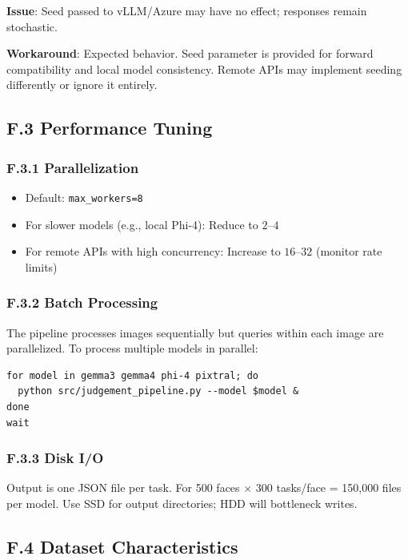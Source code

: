\textbf{Issue}: Seed passed to vLLM/Azure may have no effect; responses remain stochastic.

\textbf{Workaround}: Expected behavior. Seed parameter is provided for forward compatibility and local model consistency. Remote APIs may implement seeding differently or ignore it entirely.

\subsection*{F.3 Performance Tuning}

\subsubsection*{F.3.1 Parallelization}

\begin{itemize}
    \item Default: \texttt{max\_workers=8}
    \item For slower models (e.g., local Phi-4): Reduce to $2$--$4$
    \item For remote APIs with high concurrency: Increase to $16$--$32$ (monitor rate limits)
\end{itemize}

\subsubsection*{F.3.2 Batch Processing}

The pipeline processes images sequentially but queries within each image are parallelized. To process multiple models in parallel:

\begin{verbatim}
for model in gemma3 gemma4 phi-4 pixtral; do
  python src/judgement_pipeline.py --model $model &
done
wait
\end{verbatim}

\subsubsection*{F.3.3 Disk I/O}

Output is one JSON file per task. For 500 faces $\times$ 300 tasks/face = 150,000 files per model. Use SSD for output directories; HDD will bottleneck writes.

\subsection*{F.4 Dataset Characteristics}

